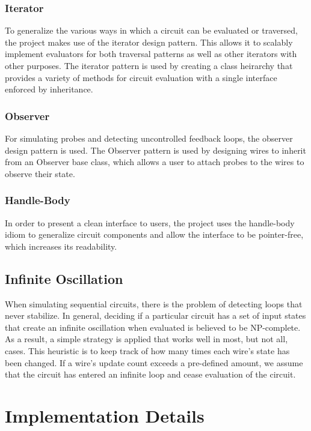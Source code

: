 \documentclass{article}
\begin{document}
\subsubsection{Iterator}

To generalize the various ways in which a circuit can be evaluated or traversed, the project makes use of the iterator design pattern. This allows it to scalably implement evaluators for both traversal patterns as well as other iterators with other purposes. The iterator pattern is used by creating a class heirarchy that provides a variety of methods for circuit evaluation with a single interface enforced by inheritance.

\subsubsection{Observer}

For simulating probes and detecting uncontrolled feedback loops, the observer design pattern is used. The Observer pattern is used by designing wires to inherit from an Observer base class, which allows a user to attach probes to the wires to observe their state.

\subsubsection{Handle-Body}

In order to present a clean interface to users, the project uses the handle-body idiom to generalize circuit components and allow the interface to be pointer-free, which increases its readability.

\subsection{Infinite Oscillation}

When simulating sequential circuits, there is the problem of detecting loops that never stabilize. In general, deciding if a particular circuit has a set of input states that create an infinite oscillation when evaluated is believed to be NP-complete\cite{alg_bible}. As a result, a simple strategy is applied that works well in most, but not all, cases. This heuristic is to keep track of how many times each wire’s state has been changed. If a wire's update count exceeds a pre-defined amount, we assume that the circuit has entered an infinite loop and cease evaluation of the circuit.

\section{Implementation Details}
\end{document}
